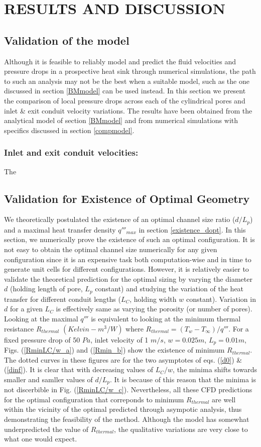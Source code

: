 \documentclass[twocolumn,10pt,cleanfoot]{ihmtc}
\begin{document}
\section{RESULTS AND DISCUSSION}
%
\subsection{Validation of the model}
Although it is feasible to reliably model and predict the fluid velocities and pressure drops in a prospective heat sink through numerical simulations, the path to such an analysis may not be the best when a suitable model, such as the one discussed in section \ref{BMmodel} can be used instead. In this section we present the comparison of local pressure drops across each of the cylindrical pores and inlet \& exit conduit velocity variations. The results have been obtained from the analytical model of section \ref{BMmodel} and from numerical simulations with specifics discussed in section \ref{compmodel}.
\subsubsection*{Inlet and exit conduit velocities:} The 


\subsection{Validation for Existence of Optimal Geometry}
We theoretically postulated the existence of an optimal channel size ratio ($d/L_p$) and a maximal heat transfer density $q'''_{max}$ in section \ref{existence_dopt}. In this section, we numerically prove the existence of such an optimal configuration. It is not easy to obtain the optimal channel size numerically for any given configuration since it is an expensive task both computation-wise and in time to generate unit cells for different configurations. However, it is relatively easier to validate the theoretical prediction for the optimal sizing by varying the diameter $d$ (holding length of pore, $L_p$ constant) and studying the variation of the heat transfer for different conduit lengths ($L_C$, holding width $w$ constant). Variation in $d$ for a given $L_C$ is effectively same as varying the porosity (or number of pores). Looking at the maximal $q'''$ is equivalent to looking at the minimum thermal resistance $R_{thermal}$ $(Kelvin-m^3/W)$ where $R_{thermal}=(T_w-T_{\infty})/q'''$. For a fixed pressure drop of 50 $Pa$, inlet velocity of 1 $m/s$, $w=0.025m$, $L_p=0.01m$, Figs. (\ref{RminLC/w_a}) and (\ref{Rmin_b}) show the existence of minimum $R_{thermal}$. The dotted curves in these figures are for the two asymptotes of eqs. (\ref{d0}) \& (\ref{dinf}). It is clear that with decreasing values of $L_C/w$, the minima shifts towards smaller and samller values of $d/L_p$. It is because of this reason that the minima is not discerbible in Fig. (\ref{RminLC/w_c}). Nevertheless, all these CFD predictions for the optimal configuration that correponds to minimum $R_{thermal}$ are well within the vicinity of the optimal predicted through asympotic analysis, thus demonstrating the feasibility of the method.  Although the model has somewhat underpredicted the value of $R_{thermal}$, the qualitative variations are very close to what one would expect.
\end{document}
